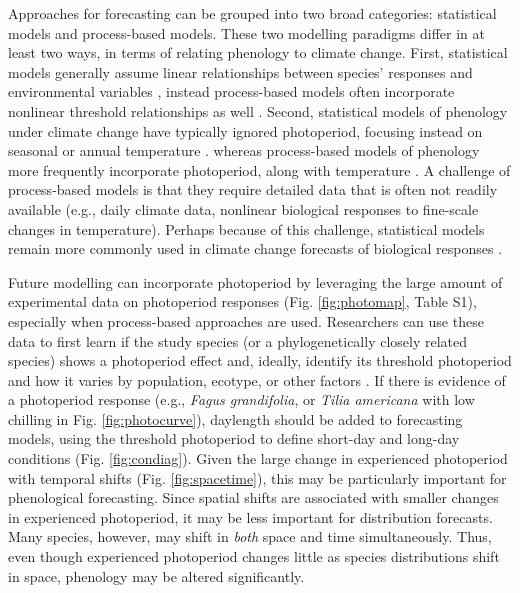 \documentclass{article}
\begin{document}
\par Approaches for forecasting can be grouped into two broad categories: statistical models and process-based models. These two modelling paradigms differ in at least two ways, in terms of relating phenology to climate change. First, statistical models generally assume linear relationships between species' responses and environmental variables \citep[e.g., ][]{flynn2018,van2007,ibanez2010}, instead process-based models often incorporate nonlinear threshold relationships as well \citep[e.g.][]{chuine2001,morin2009,xie1989}. Second, statistical models of phenology under climate change have typically ignored photoperiod, focusing instead on seasonal or annual temperature \citep[e.g.][but see \citet{richardson2013}]{diez2012,ibanez2010,van2007}. %
whereas process-based models of phenology more frequently incorporate photoperiod, along with temperature \citep{duputie2015,morin2009,xie1989,zhao2013}. A challenge of process-based models is that they require detailed data that is often not readily available (e.g., daily climate data, nonlinear biological responses to fine-scale changes in temperature). Perhaps because of this challenge, statistical models remain more commonly used in climate change forecasts of biological responses \citep[e.g.,][]{Basler:2012,diez2012,garcia2016,ibanez2010,van2007,zhu2012}.

\par Future modelling can incorporate photoperiod by leveraging the large amount of experimental data on photoperiod responses (Fig. \ref{fig:photomap}, Table S1), especially when process-based approaches are used. Researchers can use these data to first learn if the study species (or a phylogenetically closely related species) shows a photoperiod effect and, ideally, identify its threshold photoperiod and how it varies by population, ecotype, or other factors \citep{bradshaw2006,gwinner1996,tobin2008}. If there is evidence of a photoperiod response (e.g., \emph{Fagus grandifolia}, or \emph{Tilia americana} with low chilling in Fig. \ref {fig:photocurve}), daylength should be added to forecasting models, using the threshold photoperiod to define short-day and long-day conditions (Fig. \ref{fig:condiag}). Given the large change in experienced photoperiod with temporal shifts (Fig. \ref{fig:spacetime}), this may be particularly important for phenological forecasting. Since spatial shifts are associated with smaller changes in experienced photoperiod, it may be less important for distribution forecasts. Many species, however, may shift in \emph{both} space and time simultaneously. Thus, even though experienced photoperiod changes little as species distributions shift in space, phenology may be altered significantly.
\end{document}
